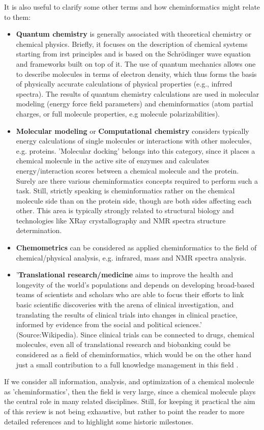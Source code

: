 \documentclass{sig-alternate}
\begin{document}
It is also useful to clarify some other terms and how
cheminformatics might relate to them:
\begin{itemize}
\item \textbf{Quantum chemistry} is generally associated with
  theoretical chemistry or chemical physics. Briefly, it focuses on
  the description of chemical systems starting from irst principles
  and is based on the Schr\"{o}dinger wave equation and frameworks
built on top of it. The use of quantum mechanics allows one to
describe molecules in terms of electron density, which thus forms the
basis of physically accurate calculations of physical properties
(e.g., infrred spectra). The results of quantum chemistry calculations
are used in molecular modeling (energy force field parameters) and
cheminformatics (atom partial charges, or full molecule properties,
e.g molecule polarizabilities).
\item \textbf{Molecular modeling} or \textbf{Computational chemistry} considers typically energy calculations of single molecules or interactions
with other molecules, e.g. proteins. 'Molecular docking' belongs into this category, since it places a chemical molecule in the active site of enzymes
and calculates energy/interaction scores between a chemical molecule and the protein. Surely are there various cheminformatics concepts required to
perform such a task. Still, strictly speaking is cheminformatics rather on the chemical molecule side than on the protein side, though are both sides
affecting each other. This area is typically strongly related to structural biology and technologies like XRay crystallography and 
NMR spectra structure determination. 
\item \textbf{Chemometrics} can be considered as applied cheminformatics to the field of chemical/physical analysis, e.g. infrared, mass and NMR spectra analysis.
\item '\textbf{Translational research/medicine} aims to improve the health and longevity of the world's populations and depends on developing broad-based 
teams of scientists and scholars who are able to focus their efforts to link basic scientific discoveries with the arena of clinical investigation, 
and translating the results of clinical trials into changes in clinical practice, informed by evidence from the social and political sciences.' (Source:Wikipedia).
Since clinical trials can be connected to drugs, chemical molecules, even all of translational research and biobanking could be considered as a field
of cheminformatics, which would be on the other hand just a small contribution to a full knowledge management in this field \cite{Szalma2010}.
\end{itemize}
If we consider all information, analysis, and optimization of a chemical molecule as 'cheminformatics', then the field is very large, since a chemical
molecule plays the central role in many related disciplines. Still, for keeping it practical the aim of this review is not being exhaustive, but rather to 
point the reader to more detailed references and to highlight some historic milestones. 
\end{document}
